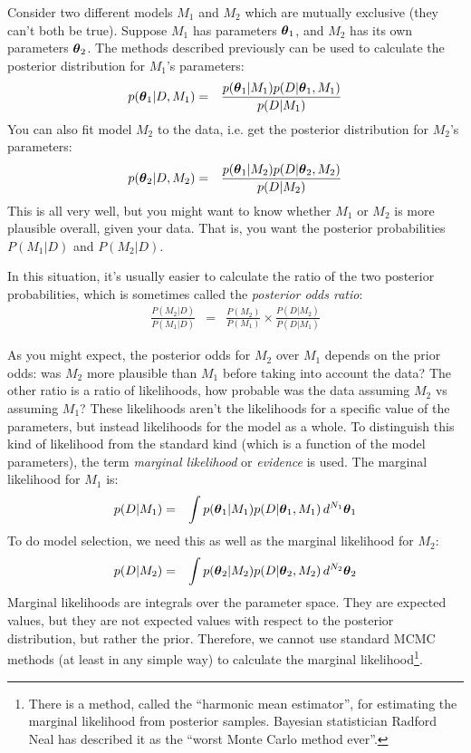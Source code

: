 Consider two different models $M_1$ and $M_2$ which are mutually exclusive
(they can't both be true).
Suppose $M_1$ has parameters
$\boldsymbol{\theta}_1$, and $M_2$ has its own parameters $\boldsymbol{\theta}_2$. The methods
described previously can be used to calculate the posterior distribution for
$M_1$'s parameters:
\begin{eqnarray}
p(\boldsymbol{\theta}_1 | D, M_1) &=& \frac{p(\boldsymbol{\theta}_1 | M_1)p(D | \boldsymbol{\theta}_1, M_1)}
{p(D | M_1)}
\end{eqnarray}
You can also fit model $M_2$ to the data, i.e. get the posterior distribution
for $M_2$'s parameters:
\begin{eqnarray}
p(\boldsymbol{\theta}_2 | D, M_2) &=& \frac{p(\boldsymbol{\theta}_1 | M_2)p(D | \boldsymbol{\theta}_2, M_2)}
{p(D | M_2)}
\end{eqnarray}
This is all very well, but you might want to know whether $M_1$ or $M_2$ is
more plausible overall, given your data. That is, you want the posterior
probabilities $P(M_1 | D)$ and $P(M_2 | D)$.

In this situation, it's usually easier to calculate the ratio of the two
posterior probabilities, which is sometimes called the {\it posterior odds
ratio}:
\begin{eqnarray}
\frac{P(M_2 | D)}{P(M_1 | D)} &=& \frac{P(M_2)}{P(M_1)}
\times \frac{P(D | M_2)}{P(D | M_1)}
\end{eqnarray}

As you might expect, the posterior odds for $M_2$ over $M_1$ depends on the
prior odds: was $M_2$ more plausible than $M_1$ before taking into account the
data? The other ratio is a ratio of likelihoods, how probable was the data
assuming $M_2$ vs assuming $M_1$? These likelihoods aren't the likelihoods
for a specific value of the parameters, but instead likelihoods for the model
as a whole. To distinguish this kind of likelihood from the standard kind (which
is a function of the model parameters), the term {\it marginal likelihood} or
{\it evidence} is used. The marginal likelihood for $M_1$ is:
\begin{eqnarray}
p(D | M_1) &=& \int p(\boldsymbol{\theta}_1 | M_1) p(D | \boldsymbol{\theta}_1, M_1) \, d^{N_1} \boldsymbol{\theta}_1
\label{eq:marginal_likelihood}
\end{eqnarray}
To do model selection, we need this as well as the marginal likelihood for
$M_2$:
\begin{eqnarray}
p(D | M_2) &=& \int p(\boldsymbol{\theta}_2 | M_2) p(D | \boldsymbol{\theta}_2, M_2) \, d^{N_2} \boldsymbol{\theta}_2
\end{eqnarray}
Marginal likelihoods are integrals over the parameter space. They are
expected values, but they are not expected values with respect to the posterior
distribution, but rather the prior. Therefore, we cannot use standard MCMC
methods (at least in any simple way) to calculate the marginal
likelihood\footnote{There is a method, called the ``harmonic mean estimator'',
for estimating the marginal likelihood from posterior samples. Bayesian
statistician Radford Neal has described it as the
``worst Monte Carlo method ever''.}.

